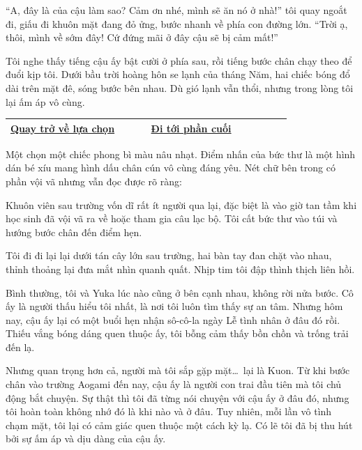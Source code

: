 \documentclass[../main.tex]{subfiles}
\begin{document}
``A, đây là của cậu làm sao? Cảm ơn nhé, mình sẽ ăn nó ở nhà!'' tôi quay ngoắt đi, giấu đi khuôn mặt đang đỏ ửng, bước nhanh về phía con đường lớn. ``Trời ạ, thôi, mình về sớm đây! Cứ đứng mãi ở đây cậu sẽ bị cảm mất!''

Tôi nghe thấy tiếng cậu ấy bật cười ở phía sau, rồi tiếng bước chân chạy theo để đuổi kịp tôi. Dưới bầu trời hoàng hôn se lạnh của tháng Năm, hai chiếc bóng đổ dài trên mặt đê, sóng bước bên nhau. Dù gió lạnh vẫn thổi, nhưng trong lòng tôi lại ấm áp vô cùng.

\begin{table}[H]
  \centering
  \setlength{\arrayrulewidth}{1pt}
  \begin{tabular}{|>{\centering\arraybackslash}p{0.4\linewidth}|>{\centering\arraybackslash}p{0.4\linewidth}|}
    \hline
    \hyperref[choice]{Quay trở về lựa chọn} & \hyperref[ending]{Đi tới phần cuối} \\ \hline
  \end{tabular}
\end{table}

\newpage
\label{akane}

Một chọn một chiếc phong bì màu nâu nhạt. Điểm nhấn của bức thư là một hình dán bé xíu mang hình dấu chân cún vô cùng đáng yêu. Nét chữ bên trong có phần vội vã nhưng vẫn đọc được rõ ràng:


Khuôn viên sau trường vốn dĩ rất ít người qua lại, đặc biệt là vào giờ tan tầm khi học sinh đã vội vã ra về hoặc tham gia câu lạc bộ. Tôi cất bức thư vào túi và hướng bước chân đến điểm hẹn.

\ct


Tôi đi đi lại lại dưới tán cây lớn sau trường, hai bàn tay đan chặt vào nhau, thỉnh thoảng lại đưa mắt nhìn quanh quất. Nhịp tim tôi đập thình thịch liên hồi.

Bình thường, tôi và Yuka lúc nào cũng ở bên cạnh nhau, không rời nửa bước. Cô ấy là người thấu hiểu tôi nhất, là nơi tôi luôn tìm thấy sự an tâm. Nhưng hôm nay, cậu ấy lại có một buổi hẹn nhận sô-cô-la ngày Lễ tình nhân ở đâu đó rồi. Thiếu vắng bóng dáng quen thuộc ấy, tôi bỗng cảm thấy bồn chồn và trống trải đến lạ.

Nhưng quan trọng hơn cả, người mà tôi sắp gặp mặt\dots\ lại là Kuon. Từ khi bước chân vào trường Aogami đến nay, cậu ấy là người con trai đầu tiên mà tôi chủ động bắt chuyện. Sự thật thì tôi đã từng nói chuyện với cậu ấy ở đâu đó, nhưng tôi hoàn toàn không nhớ đó là khi nào và ở đâu. Tuy nhiên, mỗi lần vô tình chạm mặt, tôi lại có cảm giác quen thuộc một cách kỳ lạ. Có lẽ tôi đã bị thu hút bởi sự ấm áp và dịu dàng của cậu ấy.
\end{document}
